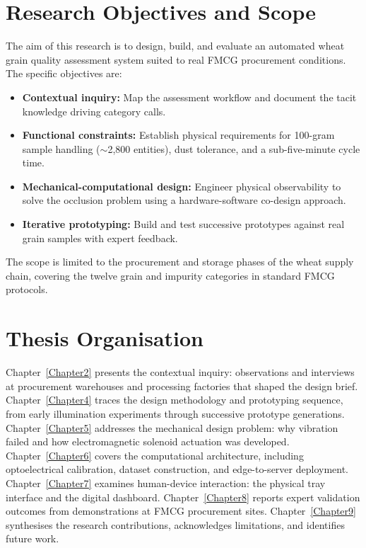 \section{Research Objectives and Scope}

The aim of this research is to design, build, and evaluate an automated wheat grain quality assessment system suited to real FMCG procurement conditions. The specific objectives are:

\begin{itemize}
    \item \textbf{Contextual inquiry:} Map the assessment workflow and document the tacit knowledge driving category calls.
    \item \textbf{Functional constraints:} Establish physical requirements for 100-gram sample handling ($\sim$2,800 entities), dust tolerance, and a sub-five-minute cycle time.
    \item \textbf{Mechanical-computational design:} Engineer physical observability to solve the occlusion problem using a hardware-software co-design approach.
    \item \textbf{Iterative prototyping:} Build and test successive prototypes against real grain samples with expert feedback.
\end{itemize}

The scope is limited to the procurement and storage phases of the wheat supply chain, covering the twelve grain and impurity categories in standard FMCG protocols.

\section{Thesis Organisation}

Chapter~\ref{Chapter2} presents the contextual inquiry: observations and interviews at procurement warehouses and processing factories that shaped the design brief.
Chapter~\ref{Chapter4} traces the design methodology and prototyping sequence, from early illumination experiments through successive prototype generations.
Chapter~\ref{Chapter5} addresses the mechanical design problem: why vibration failed and how electromagnetic solenoid actuation was developed.
Chapter~\ref{Chapter6} covers the computational architecture, including optoelectrical calibration, dataset construction, and edge-to-server deployment.
Chapter~\ref{Chapter7} examines human-device interaction: the physical tray interface and the digital dashboard.
Chapter~\ref{Chapter8} reports expert validation outcomes from demonstrations at FMCG procurement sites.
Chapter~\ref{Chapter9} synthesises the research contributions, acknowledges limitations, and identifies future work.
